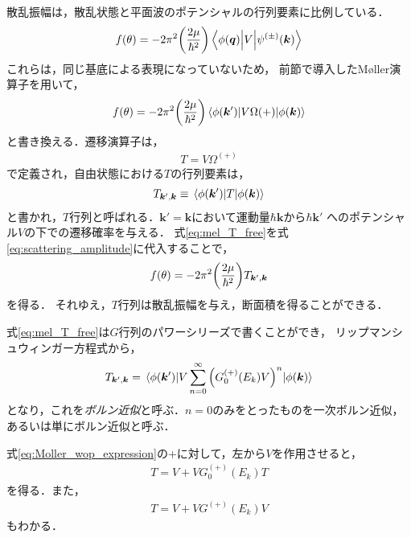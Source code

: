 \documentclass[a4paper,11pt]{ltjsarticle}
\numberwithin{equation}{section}
\begin{document}
散乱振幅は，散乱状態と平面波のポテンシャルの行列要素に比例している．
\begin{align}\label{eq:scattering_amplitude}
  f(\theta) = -2\pi^2 \qty(\frac{2\mu}{\hbar^2}) \mel{\phi(\bm{q})}{V}{\psi^{(\pm)}(\bm{k})}
\end{align}
これらは，同じ基底による表現になっていないため，
前節で導入したM\o ller演算子を用いて，
\begin{align}\label{eq:scattering_amplitude_moller}
  f(\theta) = -2\pi^2\qty(\frac{2\mu}{\hbar^2}) \mel{\phi(\bm{k}')}{V \Omega{(+)}}{\phi(\bm{k})}
\end{align}
と書き換える．遷移演算子は，
\begin{align}\label{eq:def_transition_operator}
  T = V \Omega^{(+)}
\end{align}
で定義され，自由状態における$T$の行列要素は，
\begin{align}\label{eq:mel_T_free}
  T_{\bm{k}', \bm{k}} \equiv \mel{\phi(\bm{k}')}{T}{\phi(\bm{k})}
\end{align}
と書かれ，$T$行列と呼ばれる．$\bm{k}' = \bm{k}$において運動量$\hbar \bm{k}$から$\hbar \bm{k}'$
へのポテンシャル$V$の下での遷移確率を与える．
式\ref{eq:mel_T_free}を式\ref{eq:scattering_amplitude}に代入することで，
\begin{align}\label{eq:scattering_amplitude_tmatrix}
  f(\theta) = -2\pi^2 \qty(\frac{2\mu}{\hbar^2}) T_{\bm{k}', \bm{k}}
\end{align}
を得る．
それゆえ，$T$行列は散乱振幅を与え，断面積を得ることができる．

式\ref{eq:mel_T_free}は$G$行列のパワーシリーズで書くことができ，
リップマンシュウィンガー方程式から，
\begin{align}\label{eq:tmatrix_power_series}
  T_{\bm{k}', \bm{k}} = \mel{\phi(\bm{k}')}{V\sum_{n=0}^{\infty} \qty(G_0^{(+)}(E_k)V)^n}{\phi(\bm{k})}
\end{align}
となり，これを\emph{ボルン近似}と呼ぶ．$n=0$のみをとったものを一次ボルン近似，
あるいは単にボルン近似と呼ぶ．

式\ref{eq:Moller_wop_expression}の+に対して，左から$V$を作用させると，
\begin{align}\label{eq:LS_for_t}
  T = V + V G_0^{(+)}(E_k)T
\end{align}
を得る．また，
\begin{align}\label{eq:LS_for_t_g}
  T = V + VG^{(+)}(E_k)V
\end{align}
もわかる．
\end{document}
